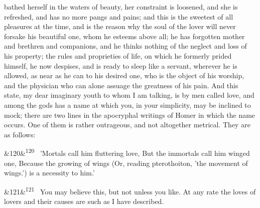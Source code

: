 \documentclass[12pt]{article}
\newcommand{\para}[1][]{\par\noindent\ifx&#1&\else\textsuperscript{\footnotesize #1}~\fi}
\begin{document}
bathed herself in the waters of beauty, her constraint is loosened, and she is refreshed, and has no more pangs and pains; and this is the sweetest of all pleasures at the time, and is the reason why the soul of the lover will never forsake his beautiful one, whom he esteems above all; he has forgotten mother and brethren and companions, and he thinks nothing of the neglect and loss of his property; the rules and proprieties of life, on which he formerly prided himself, he now despises, and is ready to sleep like a servant, wherever he is allowed, as near as he can to his desired one, who is the object of his worship, and the physician who can alone assuage the greatness of his pain. And this state, my dear imaginary youth to whom I am talking, is by men called love, and among the gods has a name at which you, in your simplicity, may be inclined to mock; there are two lines in the apocryphal writings of Homer in which the name occurs. One of them is rather outrageous, and not altogether metrical. They are as follows:

\para[120] 'Mortals call him fluttering love, But the immortals call him winged one, Because the growing of wings (Or, reading pterothoiton, 'the movement of wings.') is a necessity to him.'

\para[121] You may believe this, but not unless you like. At any rate the loves of lovers and their causes are such as I have described.
\end{document}
